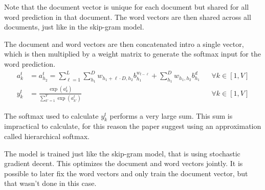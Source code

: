 Note that the document vector is unique for each document but shared for all word prediction in that document. The word vectors are then shared across all documents, just like in the skip-gram model.

The document and word vectors are then concatenated intro a single vector, which is then multiplied by a weight matrix to generate the softmax input for the word prediction.
\begin{equation}
\begin{aligned}
a_{k}^t &= a_{h_2}^t = \sum_{\ell=1}^L \sum_{h_1}^D w_{h_1 + \ell \cdot D, h_2} b_{h_1}^{w_{t - \ell}} + \sum_{h_1}^D w_{h_1, h_2} b_{h_1}^d && \forall k \in [1, V] \\
y_{k}^t &= \frac{\exp(a_k^t)}{\sum_{k'=1}^V \exp(a_{k'}^t)} && \forall k \in [1, V]
\end{aligned}
\end{equation}

The softmax used to calculate $y_{k}^t$ performs a very large sum. This sum is impractical to calculate, for this reason the paper \cite{doc2vec} suggest using an approximation called hierarchical softmax.

The model is trained just like the skip-gram model, that is using stochastic gradient decent. This optimizes the document and word vectors jointly. It is possible to later fix the word vectors and only train the document vector, but that wasn't done in this case.
